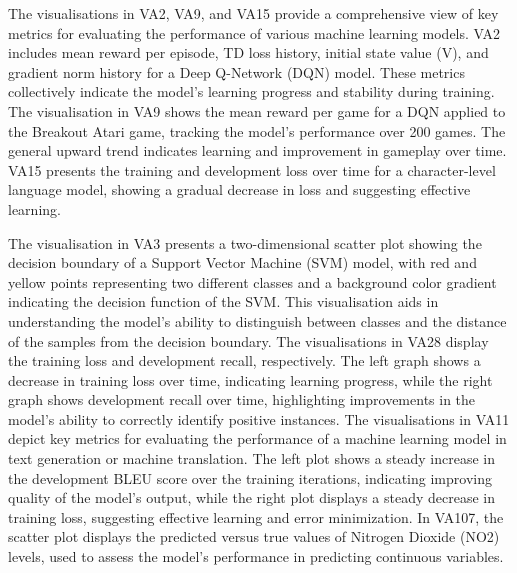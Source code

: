 The visualisations in VA2, VA9, and VA15 provide a comprehensive view of key metrics for evaluating the performance of various machine learning models. VA2 includes mean reward per episode, TD loss history, initial state value (V), and gradient norm history for a Deep Q-Network (DQN) model. These metrics collectively indicate the model's learning progress and stability during training. The visualisation in VA9 shows the mean reward per game for a DQN applied to the Breakout Atari game, tracking the model's performance over 200 games. The general upward trend indicates learning and improvement in gameplay over time. VA15 presents the training and development loss over time for a character-level language model, showing a gradual decrease in loss and suggesting effective learning.

The visualisation in VA3 presents a two-dimensional scatter plot showing the decision boundary of a Support Vector Machine (SVM) model, with red and yellow points representing two different classes and a background color gradient indicating the decision function of the SVM. This visualisation aids in understanding the model's ability to distinguish between classes and the distance of the samples from the decision boundary. The visualisations in VA28 display the training loss and development recall, respectively. The left graph shows a decrease in training loss over time, indicating learning progress, while the right graph shows development recall over time, highlighting improvements in the model's ability to correctly identify positive instances. The visualisations in VA11 depict key metrics for evaluating the performance of a machine learning model in text generation or machine translation. The left plot shows a steady increase in the development BLEU score over the training iterations, indicating improving quality of the model's output, while the right plot displays a steady decrease in training loss, suggesting effective learning and error minimization. In VA107, the scatter plot displays the predicted versus true values of Nitrogen Dioxide (NO2) levels, used to assess the model's performance in predicting continuous variables.

